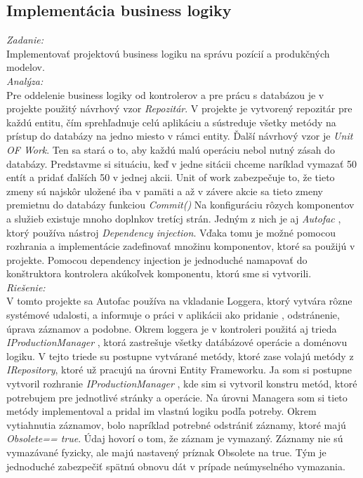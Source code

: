 \documentclass[11pt, oneside]{report}
\begin{document}
\subsection{Implementácia business logiky}
\textit{Zadanie:}\\
Implementovať projektovú business logiku na správu pozícií a produkčných modelov.
\\\textit{Analýza:}\\
Pre oddelenie business logiky od kontrolerov a pre prácu s databázou je v projekte použitý návrhový vzor \textit{Repozitár}. V projekte je vytvorený repozitár pre každú entitu, čím  sprehľadnuje celú aplikáciu a sústreduje všetky metódy na prístup do databázy na jedno miesto v rámci entity. Ďalší návrhový vzor je \textit{Unit OF Work}. Ten sa stará o to, aby každú malú operáciu nebol nutný zásah do databázy. Predstavme si situáciu, keď v jedne sitácii chceme  naríklad  vymazať 50 entít a pridať ďalších 50 v jednej akcii. Unit of work zabezpečuje to, že tieto zmeny sú najskôr uložené  iba v pamäti a až v závere akcie sa tieto zmeny premietnu do databázy funkciou \textit{Commit()}
Na konfiguráciu  rôzych komponentov a služieb existuje mnoho doplnkov tretícj strán. Jedným z nich je aj \textit{Autofac} , ktorý používa  nástroj \textit{Dependency injection}. Vďaka tomu je možné pomocou rozhrania a  implementácie zadefinovať množinu komponentov, ktoré sa použijú v projekte. Pomocou dependency injection je jednoduché namapovať do konštruktora kontrolera akúkoľvek  komponentu, ktorú sme si vytvorili. 
\\\textit{Riešenie:}\\
V tomto projekte sa Autofac používa na vkladanie  Loggera, ktorý vytvára rôzne systémové udalosti,  a informuje o  práci v aplikácii ako pridanie , odstránenie, úprava záznamov a podobne. Okrem loggera je v kontroleri použitá aj trieda \textit{IProductionManager} , ktorá zastrešuje všetky  datábázové operácie a doménovu logiku. V tejto triede su postupne vytvárané metódy, ktoré  zase volajú metódy z \textit{IRepository}, ktoré už pracujú na úrovni Entity Frameworku. Ja som  si  postupne vytvoril rozhranie \textit{IProductionManager} , kde sim si vytvoril konstru  metód, ktoré potrebujem pre  jednotlivé stránky a operácie. Na úrovni Managera som si  tieto metódy implementoval a pridal im vlastnú logiku  podľa potreby. Okrem vytiahnutia záznamov, bolo napríklad potrebné odstrániť záznamy, ktoré majú \textit{Obsolete== true}. Údaj hovorí o tom, že  záznam je vymazaný. Záznamy nie sú vymazávané fyzicky, ale majú nastavený príznak  Obsolete na true. Tým je jednoduché zabezpečiť spätnú obnovu dát v prípade neúmyselného vymazania.
\end{document}
